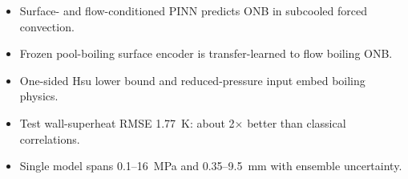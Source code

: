 \begin{itemize}
\item Surface- and flow-conditioned PINN predicts ONB in subcooled forced convection.
\item Frozen pool-boiling surface encoder is transfer-learned to flow boiling ONB.
\item One-sided Hsu lower bound and reduced-pressure input embed boiling physics.
\item Test wall-superheat RMSE 1.77~K: about 2$\times$ better than classical correlations.
\item Single model spans 0.1--16~MPa and 0.35--9.5~mm with ensemble uncertainty.
\end{itemize}
